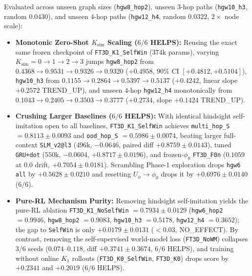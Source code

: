 \documentclass[11pt]{article}
\newcommand{\Uphi}{U_\phi}
\newcommand{\Ksim}{K_{\mathrm{sim}}}
\begin{document}
Evaluated across unseen graph sizes (\texttt{hgw8\_hop2}), unseen $3$-hop paths (\texttt{hgw10\_h3}, random $0.0430$), and unseen $4$-hop paths (\texttt{hgw12\_h4}, random $0.0322$, $2\times$ node scale):
\begin{itemize}
  \item \textbf{Monotonic Zero-Shot $\Ksim$ Scaling ($6/6$ HELPS):} Reusing the exact same frozen checkpoint of \texttt{FT3D\_K1\_SelfWin} ($374\text{k}$ params), varying $\Ksim = 0 \to 1 \to 2 \to 3$ jumps \texttt{hgw8\_hop2} from $0.4368 \to 0.9531 \to 0.9326 \to 0.9320$ ($+0.4958$, $90\%$ CI $[+0.4812,+0.5104]$), \texttt{hgw10\_h3} from $0.1155 \to 0.2864 \to 0.5397 \to 0.5137$ ($+0.4242$, linear slope $+0.2572$ \textsc{TREND\_UP}), and unseen $4$-hop \texttt{hgw12\_h4} monotonically from $0.1043 \to 0.2405 \to 0.3503 \to 0.3777$ ($+0.2734$, slope $+0.1424$ \textsc{TREND\_UP}).
  \item \textbf{Crushing Larger Baselines ($6/6$ HELPS):} With identical hindsight self-imitation open to all baselines, \texttt{FT3D\_K1\_SelfWin} achieves \texttt{multi\_hop\_S} $= 0.8113 \pm 0.0093$ and \texttt{ood\_hop\_S} $= 0.5986 \pm 0.0074$, beating larger full-context \texttt{SLM\_v2@l3} ($496\text{k}$, $-0.0646$, paired diff $+0.8759 \pm 0.0143$), tuned \texttt{GRU+dot} ($550\text{k}$, $-0.0604$, $+0.8717 \pm 0.0196$), and frozen-$\phi_0$ \texttt{FT3D\_F0n} ($0.1059$ at $0.0$ drift, $+0.7054 \pm 0.0181$). Scrambling Phase-1 exploration drops \texttt{hgw6 all} by $+0.5628 \pm 0.0210$ and resetting $\Uphi \to \phi_0$ drops it by $+0.6976 \pm 0.0140$ ($6/6$).
  \item \textbf{Pure-RL Mechanism Purity:} Removing hindsight self-imitation yields the pure-RL ablation \texttt{FT3D\_K1\_\allowbreak NoSelfWin} $= 0.7934 \pm 0.0129$ (\texttt{hgw6\_hop2} $= 0.9946$, \texttt{hgw8\_hop2} $= 0.9083$, \texttt{hgw10\_h3} $= 0.5178$, \texttt{hgw12\_h4} $= 0.3652$); the gap to \texttt{SelfWin} is only $+0.0179 \pm 0.0131$ ($< 0.03$, \textsc{NO\_EFFECT}). By contrast, removing the self-supervised world-model loss (\texttt{FT3D\_NoWM}) collapses $3/6$ seeds ($0.074\text{--}0.118$, diff $+0.3741 \pm 0.3674$, $6/6$ HELPS), and training without online $K_1$ rollouts (\texttt{FT3D\_K0\_SelfWin}, \texttt{FT3D\_K0}) drops score by $+0.2341$ and $+0.2019$ ($6/6$ HELPS).
\end{itemize}
\end{document}
